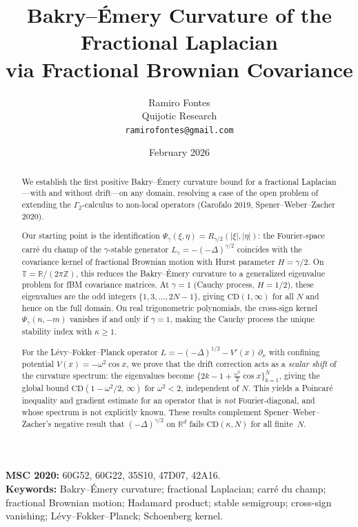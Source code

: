 \documentclass[11pt,a4paper]{article}
\title{Bakry--\'Emery Curvature of the Fractional Laplacian\\
via Fractional Brownian Covariance}
\author{Ramiro Fontes\\
Quijotic Research\\
\texttt{ramirofontes@gmail.com}}
\date{February 2026}
\theoremstyle{plain}
\theoremstyle{definition}
\theoremstyle{remark}
\newcommand{\R}{\mathbb{R}}
\newcommand{\Z}{\mathbb{Z}}
\newcommand{\T}{\mathbb{T}}
\begin{document}
\maketitle

\begin{abstract}
We establish the first positive Bakry--\'Emery curvature bound for
a fractional Laplacian---with and without drift---on any domain,
resolving a case of the open problem of extending the $\Gamma_2$-calculus
to non-local operators (Garofalo 2019, Spener--Weber--Zacher 2020).

Our starting point is the identification
$\Psi_\gamma(\xi,\eta) = R_{\gamma/2}(|\xi|,|\eta|)$:
the Fourier-space carr\'e du champ of the $\gamma$-stable generator
$L_\gamma = -(-\Delta)^{\gamma/2}$ coincides with the covariance
kernel of fractional Brownian motion with Hurst parameter $H = \gamma/2$.
On $\T = \R/(2\pi\Z)$, this reduces the Bakry--\'Emery curvature
to a generalized eigenvalue problem for fBM covariance matrices.
At $\gamma = 1$ (Cauchy process, $H = 1/2$), these eigenvalues are the
odd integers $\{1,3,\ldots,2N{-}1\}$, giving $\mathrm{CD}(1,\infty)$
for all $N$ and hence on the full domain.
On real trigonometric polynomials, the cross-sign kernel
$\Psi_\gamma(n,-m)$ vanishes if and only if $\gamma = 1$,
making the Cauchy process the unique stability index with $\kappa \geq 1$.

For the L\'evy--Fokker--Planck operator
$L = -(-\Delta)^{1/2} - V'(x)\,\partial_x$ with confining potential
$V(x) = -\omega^2\cos x$, we prove that the drift correction acts
as a \emph{scalar shift} of the curvature spectrum: the eigenvalues
become $\{2k{-}1 + \frac{\omega^2}{2}\cos x\}_{k=1}^N$,
giving the global bound $\mathrm{CD}(1-\omega^2/2,\,\infty)$
for $\omega^2 < 2$, independent of $N$.
This yields a Poincar\'e inequality and gradient estimate for an
operator that is \emph{not} Fourier-diagonal, and whose spectrum
is not explicitly known.
These results complement Spener--Weber--Zacher's negative result
that $(-\Delta)^{\gamma/2}$ on $\R^d$ fails
$\mathrm{CD}(\kappa,N)$ for all finite~$N$.
\end{abstract}

\medskip
\noindent\textbf{MSC 2020:} 60G52, 60G22, 35S10, 47D07, 42A16.\\
\textbf{Keywords:} Bakry--\'Emery curvature; fractional Laplacian;
carr\'e du champ; fractional Brownian motion; Hadamard product;
stable semigroup; cross-sign vanishing; L\'evy--Fokker--Planck;
Schoenberg kernel.
\end{document}
